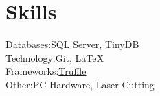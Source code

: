 \documentclass[]{resume-openfont}
\begin{document}
\section{Skills}
\begin{skillList}
               {Databases:}{\href{https://www.microsoft.com/en-us/sql-server/}{SQL Server}, \href{https://tinydb.readthedocs.io/en/latest/}{TinyDB}}
    \\
               {Technology:}{Git, \LaTeX}
    \\
               {Frameworks:}{\href{https://www.trufflesuite.com/}{Truffle}}
   \\
               {Other:}{PC Hardware, Laser Cutting}
    
    \end{skillList}
\end{document}
